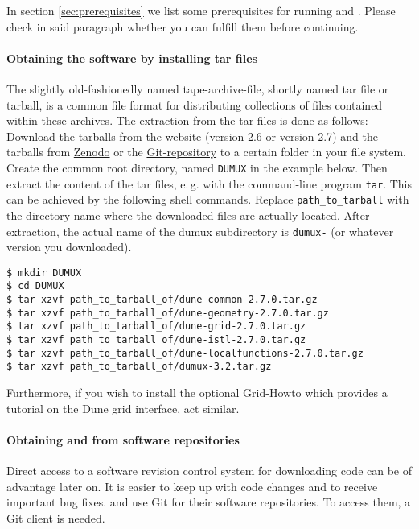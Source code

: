 In section \ref{sec:prerequisites} we list some prerequisites for running \Dune and \Dumux.
Please check in said paragraph whether you can fulfill them before continuing.

\paragraph{Obtaining the software by installing tar files}
The slightly old-fashionedly named tape-archive-file, shortly named tar file or
tarball, is a common file format for distributing collections of files contained
within these archives.
The extraction from the tar files is done as follows:
Download the \Dune tarballs from the \Dune website (version 2.6 or version 2.7) and the \Dumux tarballs from \href{https://zenodo.org/search?page=1&size=20&q=conceptrecid:2479594&all_versions&sort=-version}{Zenodo} or the \href{https://git.iws.uni-stuttgart.de/dumux-repositories/dumux}{\Dumux Git-repository} to a certain folder in your file system.
Create the common root directory, named \texttt{DUMUX} in the example below.
Then extract the content of the tar files, e.\,g. with the command-line program
\texttt{tar}.
This can be achieved by the following shell commands. Replace \texttt{path\_to\_tarball}
with the directory name where the downloaded files are actually located.
After extraction, the actual name of the dumux subdirectory is \texttt{dumux-\DumuxVersion}
(or whatever version you downloaded).

\begin{lstlisting}[style=Bash]
$ mkdir DUMUX
$ cd DUMUX
$ tar xzvf path_to_tarball_of/dune-common-2.7.0.tar.gz
$ tar xzvf path_to_tarball_of/dune-geometry-2.7.0.tar.gz
$ tar xzvf path_to_tarball_of/dune-grid-2.7.0.tar.gz
$ tar xzvf path_to_tarball_of/dune-istl-2.7.0.tar.gz
$ tar xzvf path_to_tarball_of/dune-localfunctions-2.7.0.tar.gz
$ tar xzvf path_to_tarball_of/dumux-3.2.tar.gz
\end{lstlisting}

Furthermore, if you wish to install the optional \Dune Grid-Howto which provides a tutorial
on the Dune grid interface, act similar.

\paragraph{Obtaining \Dune and \Dumux from software repositories}
Direct access to a software revision control system for downloading code can be of advantage later on.
It is easier to keep up with code changes and to receive important bug fixes.
\Dune and \Dumux use Git for their software repositories. To access them, a Git client is needed.

